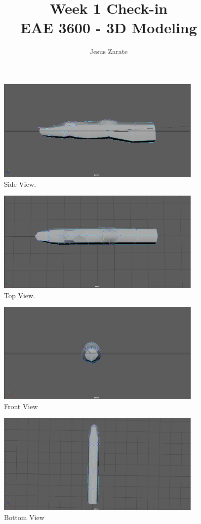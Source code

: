 \documentclass[a4paper]{article}
\title{
  Week 1 Check-in\\
  \large EAE 3600 - 3D Modeling}
\author{Jesus Zarate}
\begin{document}
\maketitle

\begin{figure}[h]
\centering
\includegraphics[width=10cm]{img/SideView.png}
\caption{Side View.}
\label{fig:Side View}
\end{figure}

\begin{figure}[h]
\centering
\includegraphics[width=10cm]{img/TopView.png}
\caption{Top View.}
\label{fig:Top View}
\end{figure}

\begin{figure}[h]
\centering
\includegraphics[width=10cm]{img/FrontView.png}
\caption{Front View}
\label{fig:Front View}
\end{figure}

\begin{figure}[h]
\centering
\includegraphics[width=10cm]{img/BottomView.png}
\caption{Bottom View}
\label{fig:Bottom View}
\end{figure}
\end{document}
